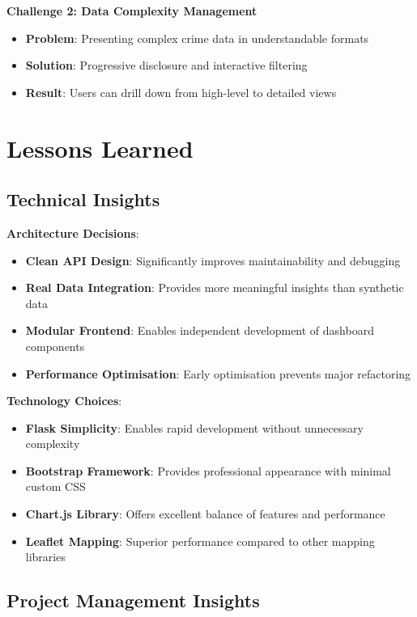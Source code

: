 \documentclass[12pt,a4paper]{article}
\begin{document}
\textbf{Challenge 2: Data Complexity Management}
\begin{itemize}
    \item \textbf{Problem}: Presenting complex crime data in understandable formats
    \item \textbf{Solution}: Progressive disclosure and interactive filtering
    \item \textbf{Result}: Users can drill down from high-level to detailed views
\end{itemize}

\section{Lessons Learned}

\subsection{Technical Insights}

\textbf{Architecture Decisions}:
\begin{itemize}
    \item \textbf{Clean API Design}: Significantly improves maintainability and debugging
    \item \textbf{Real Data Integration}: Provides more meaningful insights than synthetic data
    \item \textbf{Modular Frontend}: Enables independent development of dashboard components
    \item \textbf{Performance Optimisation}: Early optimisation prevents major refactoring
\end{itemize}

\textbf{Technology Choices}:
\begin{itemize}
    \item \textbf{Flask Simplicity}: Enables rapid development without unnecessary complexity
    \item \textbf{Bootstrap Framework}: Provides professional appearance with minimal custom CSS
    \item \textbf{Chart.js Library}: Offers excellent balance of features and performance
    \item \textbf{Leaflet Mapping}: Superior performance compared to other mapping libraries
\end{itemize}

\subsection{Project Management Insights}
\end{document}
